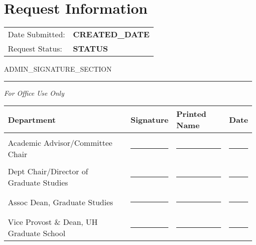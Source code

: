 \documentclass[12pt]{article}
\begin{document}
\vspace{0.5cm}

\section*{Request Information}
\begin{tabular}{ll}
Date Submitted: & \textbf{CREATED\_DATE} \\
Request Status: & \textbf{STATUS} \\
\end{tabular}

ADMIN_SIGNATURE_SECTION

\vspace{2cm}

\hrule
\vspace{0.5cm}
\small\textit{For Office Use Only}

\vspace{0.5cm}

\begin{tabular}{llll}
Department & Signature & Printed Name & Date \\
\hline
\\
Academic Advisor/Committee Chair & \rule{4cm}{0.4pt} & \rule{4cm}{0.4pt} & \rule{2.5cm}{0.4pt} \\
\\
Dept Chair/Director of Graduate Studies & \rule{4cm}{0.4pt} & \rule{4cm}{0.4pt} & \rule{2.5cm}{0.4pt} \\
\\
Assoc Dean, Graduate Studies & \rule{4cm}{0.4pt} & \rule{4cm}{0.4pt} & \rule{2.5cm}{0.4pt} \\
\\
Vice Provost \& Dean, UH Graduate School & \rule{4cm}{0.4pt} & \rule{4cm}{0.4pt} & \rule{2.5cm}{0.4pt} \\
\end{tabular}

\label{LastPage}
\end{document}

